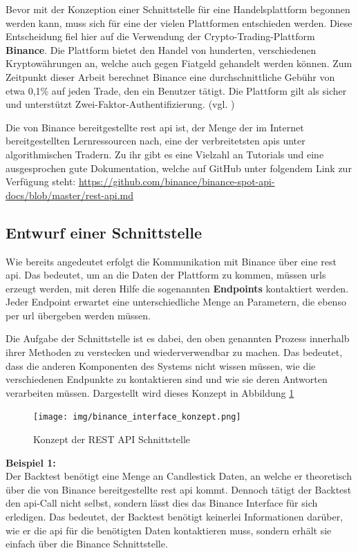\documentclass[oneside]{ausarbeitung}
\begin{document}
Bevor mit der Konzeption einer Schnittstelle für eine Handelsplattform begonnen werden kann, muss sich für eine der vielen Plattformen entschieden werden. Diese Entscheidung fiel hier auf die Verwendung der Crypto-Trading-Plattform \textbf{Binance}. Die Plattform bietet den Handel von hunderten, verschiedenen Kryptowährungen an, welche auch gegen Fiatgeld gehandelt werden können. Zum Zeitpunkt dieser Arbeit berechnet Binance eine durchschnittliche Gebühr von etwa 0,1\% auf jeden Trade, den ein Benutzer tätigt. Die Plattform gilt als sicher
und unterstützt Zwei-Faktor-Authentifizierung. (vgl. \cite{binance})

Die von Binance bereitgestellte \ac{rest} \ac{api} ist, der Menge der im Internet bereitgestellten Lernressourcen nach, eine der verbreitetsten \ac{api}s unter algorithmischen Tradern. Zu ihr gibt es eine Vielzahl an Tutorials und eine ausgesprochen gute Dokumentation, welche auf GitHub unter folgendem Link zur Verfügung steht: \url{https://github.com/binance/binance-spot-api-docs/blob/master/rest-api.md}

\subsection{Entwurf einer Schnittstelle}
\label{sub:entwurf_einer_schnittstelle}

Wie bereits angedeutet erfolgt die Kommunikation mit Binance über eine \ac{rest} \ac{api}. Das bedeutet, um an die Daten der Plattform zu kommen, müssen \ac{url}s erzeugt werden, mit deren Hilfe die sogenannten \textbf{Endpoints} kontaktiert werden. Jeder Endpoint erwartet eine unterschiedliche Menge an Parametern, die ebenso per \ac{url} übergeben werden müssen.

Die Aufgabe der Schnittstelle ist es dabei, den oben genannten Prozess innerhalb ihrer Methoden zu verstecken und wiederverwendbar zu machen. Das bedeutet, dass die anderen Komponenten des Systems nicht wissen müssen, wie die verschiedenen Endpunkte zu kontaktieren sind und wie sie deren Antworten verarbeiten müssen. Dargestellt wird dieses Konzept in Abbildung \ref{fig:9}

\begin{figure}[H]
  \centering
  \texttt{[image: img/binance\_interface\_konzept.png]}
  \caption{Konzept der REST API Schnittstelle}
  \label{fig:9}
\end{figure}

\textbf{Beispiel 1:} \\
Der Backtest benötigt eine Menge an Candlestick Daten, an welche er theoretisch über die von Binance bereitgestellte \ac{rest} \ac{api} kommt. Dennoch tätigt der Backtest den \ac{api}-Call nicht selbst, sondern lässt dies das Binance Interface für sich erledigen. Das bedeutet, der Backtest benötigt keinerlei Informationen darüber, wie er die \ac{api} für die benötigten Daten kontaktieren muss, sondern erhält sie einfach über die Binance Schnittstelle.
\end{document}
